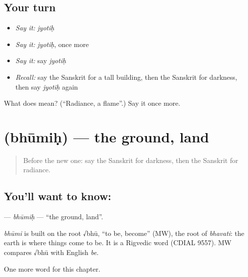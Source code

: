 \subsection*{Your turn}
\begin{itemize}
\raggedright
  \item \emph{Say it:} \emph{jyotiḥ}
  \item \emph{Say it:} \emph{jyotiḥ}, once more
  \item \emph{Say it:} say \emph{jyotiḥ}
  \item \emph{Recall:} say the Sanskrit for a tall building, then the Sanskrit for darkness, then say \emph{jyotiḥ} again
\end{itemize}

\begin{tcolorbox}[breakable,colback=teal!4,colframe=teal!35!black,title={Before you move on}]
What does  mean? (\textquotedblleft{}Radiance, a flame\textquotedblright{}.) Say it once more.
\end{tcolorbox}
\section[\texorpdfstring{\sk{भूमिः} (bhūmiḥ)}{भूमिः (bhūmiḥ)}]{ (bhūmiḥ) — the ground, land}

\label{lesson:SA-C224-bhumih}



\begin{quote}
Before the new one: say the Sanskrit for darkness, then the Sanskrit for radiance.
\end{quote}

\subsection*{You'll want to know: }
\textbf{} — \emph{bhūmiḥ} — \textquotedblleft{}the ground, land\textquotedblright{}.

\begin{cousinweb}
\emph{bhūmi} is built on the root √bhū, \textquotedblleft{}to be, become\textquotedblright{} (MW), the root of \emph{bhavati}: the earth is where things come to be. It is a Rigvedic word (CDIAL 9557). MW compares √bhū with English \emph{be}.
\end{cousinweb}

\begin{grammarlens}[title={What you've built}]
One more word for this chapter.
\end{grammarlens}

